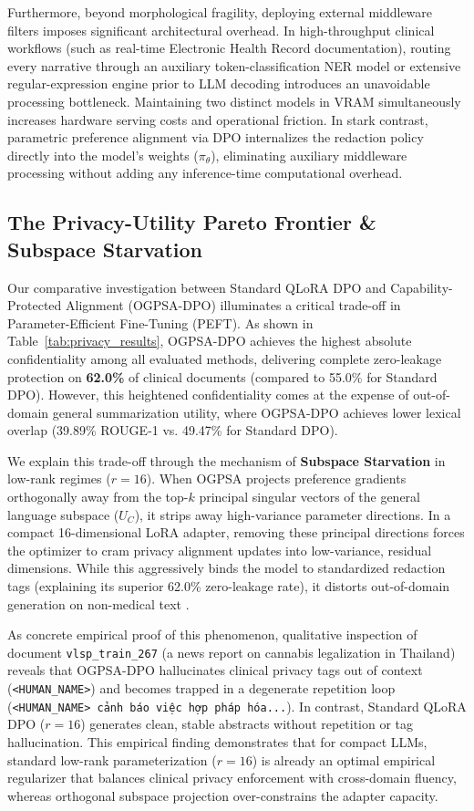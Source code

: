 \documentclass[11pt]{article}
\begin{document}
Furthermore, beyond morphological fragility, deploying external middleware filters imposes significant architectural overhead. In high-throughput clinical workflows (such as real-time Electronic Health Record documentation), routing every narrative through an auxiliary token-classification NER model or extensive regular-expression engine prior to LLM decoding introduces an unavoidable processing bottleneck. Maintaining two distinct models in VRAM simultaneously increases hardware serving costs and operational friction. In stark contrast, parametric preference alignment via DPO internalizes the redaction policy directly into the model's weights ($\pi_\theta$), eliminating auxiliary middleware processing without adding any inference-time computational overhead.

\subsection{The Privacy-Utility Pareto Frontier \& Subspace Starvation}
Our comparative investigation between Standard QLoRA DPO and Capability-Protected Alignment (OGPSA-DPO) illuminates a critical trade-off in Parameter-Efficient Fine-Tuning (PEFT). As shown in Table~\ref{tab:privacy_results}, OGPSA-DPO achieves the highest absolute confidentiality among all evaluated methods, delivering complete zero-leakage protection on \textbf{62.0\%} of clinical documents (compared to 55.0\% for Standard DPO). However, this heightened confidentiality comes at the expense of out-of-domain general summarization utility, where OGPSA-DPO achieves lower lexical overlap (39.89\% ROUGE-1 vs. 49.47\% for Standard DPO).

We explain this trade-off through the mechanism of \textbf{Subspace Starvation} in low-rank regimes ($r=16$). When OGPSA projects preference gradients orthogonally away from the top-$k$ principal singular vectors of the general language subspace ($U_C$), it strips away high-variance parameter directions. In a compact 16-dimensional LoRA adapter, removing these principal directions forces the optimizer to cram privacy alignment updates into low-variance, residual dimensions. While this aggressively binds the model to standardized redaction tags (explaining its superior 62.0\% zero-leakage rate), it distorts out-of-domain generation on non-medical text \citep{liu2024lost, bai2024longbenchv2}.

As concrete empirical proof of this phenomenon, qualitative inspection of document \texttt{vlsp\_train\_267} (a news report on cannabis legalization in Thailand) reveals that OGPSA-DPO hallucinates clinical privacy tags out of context (\texttt{<HUMAN\_NAME>}) and becomes trapped in a degenerate repetition loop (\texttt{<HUMAN\_NAME> cảnh báo việc hợp pháp hóa...}). In contrast, Standard QLoRA DPO ($r=16$) generates clean, stable abstracts without repetition or tag hallucination. This empirical finding demonstrates that for compact LLMs, standard low-rank parameterization ($r=16$) is already an optimal empirical regularizer that balances clinical privacy enforcement with cross-domain fluency, whereas orthogonal subspace projection over-constrains the adapter capacity.
\end{document}
